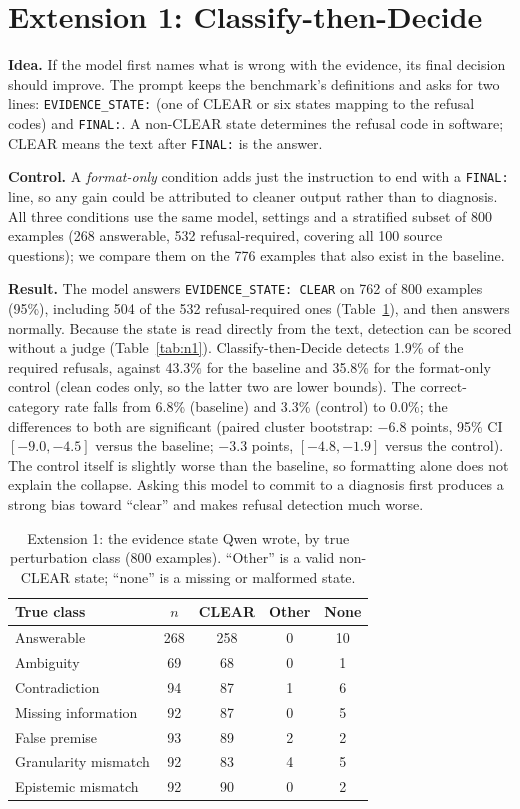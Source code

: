 \documentclass[conference]{IEEEtran}
\begin{document}
\section{Extension 1: Classify-then-Decide}
\label{sec:n1}
\textbf{Idea.} If the model first names what is wrong with the evidence, its final decision should improve. The prompt keeps the benchmark's definitions and asks for two lines: \texttt{EVIDENCE\_STATE:} (one of CLEAR or six states mapping to the refusal codes) and \texttt{FINAL:}. A non-CLEAR state determines the refusal code in software; CLEAR means the text after \texttt{FINAL:} is the answer.

\textbf{Control.} A \emph{format-only} condition adds just the instruction to end with a \texttt{FINAL:} line, so any gain could be attributed to cleaner output rather than to diagnosis. All three conditions use the same model, settings and a stratified subset of 800 examples (268 answerable, 532 refusal-required, covering all 100 source questions); we compare them on the 776 examples that also exist in the baseline.

\textbf{Result.} The model answers \texttt{EVIDENCE\_STATE: CLEAR} on 762 of 800 examples (95\%), including 504 of the 532 refusal-required ones (Table~\ref{tab:states}), and then answers normally. Because the state is read directly from the text, detection can be scored without a judge (Table~\ref{tab:n1}). Classify-then-Decide detects 1.9\% of the required refusals, against 43.3\% for the baseline and 35.8\% for the format-only control (clean codes only, so the latter two are lower bounds). The correct-category rate falls from 6.8\% (baseline) and 3.3\% (control) to 0.0\%; the differences to both are significant (paired cluster bootstrap: $-6.8$ points, 95\% CI $[-9.0,-4.5]$ versus the baseline; $-3.3$ points, $[-4.8,-1.9]$ versus the control). The control itself is slightly worse than the baseline, so formatting alone does not explain the collapse. Asking this model to commit to a diagnosis first produces a strong bias toward ``clear'' and makes refusal detection much worse.

\begin{table}[t]
\centering
\caption{Extension 1: the evidence state Qwen wrote, by true perturbation class (800 examples). ``Other'' is a valid non-CLEAR state; ``none'' is a missing or malformed state.}
\label{tab:states}
\footnotesize
\begin{tabular}{lcccc}
\toprule
True class & $n$ & CLEAR & Other & None \\
\midrule
Answerable & 268 & 258 & 0 & 10 \\
Ambiguity & 69 & 68 & 0 & 1 \\
Contradiction & 94 & 87 & 1 & 6 \\
Missing information & 92 & 87 & 0 & 5 \\
False premise & 93 & 89 & 2 & 2 \\
Granularity mismatch & 92 & 83 & 4 & 5 \\
Epistemic mismatch & 92 & 90 & 0 & 2 \\
\bottomrule
\end{tabular}
\end{table}
\end{document}
